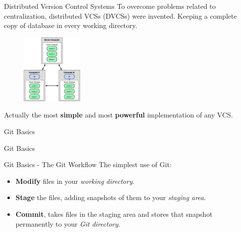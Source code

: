 \documentclass{beamer}
\def \figureHeight {130px}
\begin{document}
\begin{frame}{Distributed Version Control Systems}
	To overcome problems related to centralization, distributed VCSs (DVCSs) were invented. Keeping a complete copy of database in every working directory.
	\begin{figure}
		\includegraphics[height=\figureHeight]{images/distributed-version-control.png}
	\end{figure}
	Actually the most {\bf simple} and most {\bf powerful} implementation of any VCS.
\end{frame}

\begin{frame}{Git Basics}
	\begin{center}
		Git Basics
	\end{center}
\end{frame}

\begin{frame}{Git Basics - The Git Workflow}
	The simplest use of Git:
	\begin{itemize}
		\item {\bf Modify} files in your \emph{working directory}.
		\item {\bf Stage} the files, adding snapshots of them to your \emph{staging area}.
		\item {\bf Commit}, takes files in the staging area and stores that snapshot permanently to your \emph{Git directory}.
	\end{itemize}
\end{frame}
\end{document}
